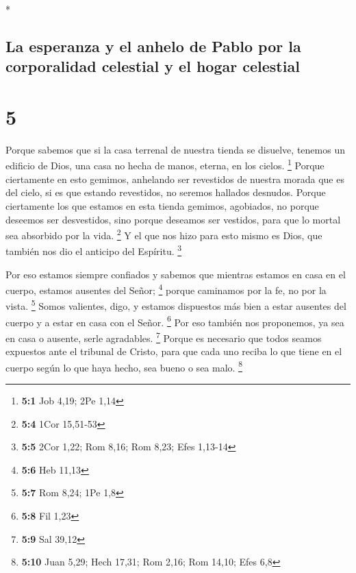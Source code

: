 \begin{paracol}{2}
\begin{otherlanguage}{english}
\end{otherlanguage}

\switchcolumn[0]*

\hypertarget{la-esperanza-y-el-anhelo-de-pablo-por-la-corporalidad-celestial-y-el-hogar-celestial}{%
\subsection{La esperanza y el anhelo de Pablo por la corporalidad
celestial y el hogar
celestial}\label{la-esperanza-y-el-anhelo-de-pablo-por-la-corporalidad-celestial-y-el-hogar-celestial}}

\hypertarget{section-8}{%
\section{5}\label{section-8}}

 Porque sabemos que si la casa terrenal de nuestra tienda
se disuelve, tenemos un edificio de Dios, una casa no hecha de manos,
eterna, en los cielos. \footnote{\textbf{5:1} Job 4,19; 2Pe 1,14}
 Porque ciertamente en esto gemimos, anhelando ser
revestidos de nuestra morada que es del cielo,  si es que
estando revestidos, no seremos hallados desnudos.  Porque
ciertamente los que estamos en esta tienda gemimos, agobiados, no porque
deseemos ser desvestidos, sino porque deseamos ser vestidos, para que lo
mortal sea absorbido por la vida. \footnote{\textbf{5:4} 1Cor 15,51-53}
 Y el que nos hizo para esto mismo es Dios, que también
nos dio el anticipo del Espíritu. \footnote{\textbf{5:5} 2Cor 1,22; Rom
  8,16; Rom 8,23; Efes 1,13-14}

 Por eso estamos siempre confiados y sabemos que mientras
estamos en casa en el cuerpo, estamos ausentes del Señor; \footnote{\textbf{5:6}
  Heb 11,13}  porque caminamos por la fe, no por la vista.
\footnote{\textbf{5:7} Rom 8,24; 1Pe 1,8}  Somos
valientes, digo, y estamos dispuestos más bien a estar ausentes del
cuerpo y a estar en casa con el Señor. \footnote{\textbf{5:8} Fil 1,23}
 Por eso también nos proponemos, ya sea en casa o ausente,
serle agradables. \footnote{\textbf{5:9} Sal 39,12} 
Porque es necesario que todos seamos expuestos ante el tribunal de
Cristo, para que cada uno reciba lo que tiene en el cuerpo según lo que
haya hecho, sea bueno o sea malo. \footnote{\textbf{5:10} Juan 5,29;
  Hech 17,31; Rom 2,16; Rom 14,10; Efes 6,8}


\end{paracol}

